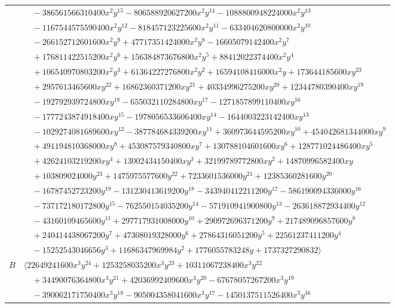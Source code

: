 \documentclass[11pt]{article}
\begin{document}
\begin{longtable}{@{}ll@{}}
 & $\quad -386561566310400x^{2}y^{15}-806588920627200x^{2}y^{14}-1088800948224000x^{2}y^{13}$\\
 & $\quad -1167544575590400x^{2}y^{12}-818457123225600x^{2}y^{11}-633404620800000x^{2}y^{10}$\\
 & $\quad -266152712601600x^{2}y^{9}+47717351424000x^{2}y^{8}-16605079142400x^{2}y^{7}$\\
 & $\quad +176811422515200x^{2}y^{6}+156384873676800x^{2}y^{5}+88412022374400x^{2}y^{4}$\\
 & $\quad +106540970803200x^{2}y^{3}+61364227276800x^{2}y^{2}+16594108416000x^{2}y+173644185600xy^{23}$\\
 & $\quad +2957613465600xy^{22}+16862360371200xy^{21}+40334996275200xy^{20}+12344780390400xy^{19}$\\
 & $\quad -192792939724800xy^{18}-655032110284800xy^{17}-1271857899110400xy^{16}$\\
 & $\quad -1777243874918400xy^{15}-1978056533606400xy^{14}-1644003223142400xy^{13}$\\
 & $\quad -1029274081689600xy^{12}-387784684339200xy^{11}+360973644595200xy^{10}+454042681344000xy^{9}$\\
 & $\quad +491194810368000xy^{8}+453087579340800xy^{7}+130788104601600xy^{6}+128771024486400xy^{5}$\\
 & $\quad +42624103219200xy^{4}+13002434150400xy^{3}+32199789772800xy^{2}+14870996582400xy$\\
 & $\quad +103809024000y^{23}+1475975577600y^{22}+7233601536000y^{21}+12385360281600y^{20}$\\
 & $\quad -16787452723200y^{19}-131230413619200y^{18}-343940412211200y^{17}-586190094336000y^{16}$\\
 & $\quad -737172180172800y^{15}-762550154035200y^{14}-571910941900800y^{13}-263618872934400y^{12}$\\
 & $\quad -43160109465600y^{11}+297717931008000y^{10}+290972696371200y^{9}+217489096857600y^{8}$\\
 & $\quad +240414438067200y^{7}+47308019328000y^{6}+27864316051200y^{5}+22561237411200y^{4}$\\
 & $\quad -15252543046656y^{3}+11686347969984y^{2}+1776055783248y+1737327290832\rangle$\\
$B$ & $\langle 22649241600x^{3}y^{24}+1253258035200x^{3}y^{23}+10311067238400x^{3}y^{22}$\\
 & $\quad +34490076364800x^{3}y^{21}+42036992409600x^{3}y^{20}-67678057267200x^{3}y^{19}$\\
 & $\quad -390062171750400x^{3}y^{18}-905004358041600x^{3}y^{17}-1450137511526400x^{3}y^{16}$\\

\end{longtable}
\end{document}
